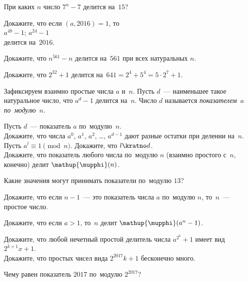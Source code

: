 


\begingroup
    \ifdefined\mathup
        \providecommand\eulerphi{\mathup{\mupphi}}\fi
    \ifdefined\upphi
        \providecommand\eulerphi{\upphi}\fi
    \providecommand\eulerphi{\phi}%

\begin{problems}

\item
При каких $n$ число $7^{n} - 7$ делится на~$15$?

\item
Докажите, что если $(a, 2016) = 1$, то
\\
\subproblem $a^{48} - 1$;
\quad
\subproblem $a^{24} - 1$
\\
делится на~$2016$.

\item
Докажите, что $n^{561} - n$ делится на~$561$ при всех натуральных $n$.

\item
Докажите, что $2^{32} + 1$ делится на~$641 = 2^4 + 5^4 = 5 \cdot 2^7 + 1$.

\end{problems}

Зафиксируем взаимно простые числа $a$ и~$n$.
Пусть $d$~--- наименьшее такое натуральное число, что $a^{d} - 1$ делится
на~$n$.
Число $d$ называется \emph{показателем~$a$ по~модулю~$n$}.

\begin{problems}

\item{}
Пусть $d$~--- показатель $a$ по~модулю~$n$.
\\
\subproblem
Докажите, что числа $a^0$, $a^1$, $a^2$, \ldots, $a^{d-1}$ дают разные остатки
при делении на~$n$.
\\
\subproblem
Пусть $a^l \equiv 1 \pmod{n}$.
Докажите, что $l \kratno d$.
\\
\subproblem
Докажите, что показатель любого числа по~модулю $n$ (взаимно простого с~$n$,
конечно) делит $\eulerphi(n)$.

\item
Какие значения могут принимать показатели по~модулю $13$?

\item
Докажите, что если $n - 1$~--- это показатель числа $a$ по~модулю $n$,
то~$n$~--- простое число.

\item
Докажите, что если $a > 1$, то~$n$ делит $\eulerphi(a^{n} - 1)$.

\item
\subproblem
Докажите, что любой нечетный простой делитель числа $a^{2^{k}} + 1$ имеет вид
$2^{k+1}x+1$.
\\
\subproblem
Докажите, что простых чисел вида $2^{2017} k + 1$ бесконечно много.

\item
Чему равен показатель $2017$ по~модулю $2^{2017}$?

\end{problems}

\endgroup %


